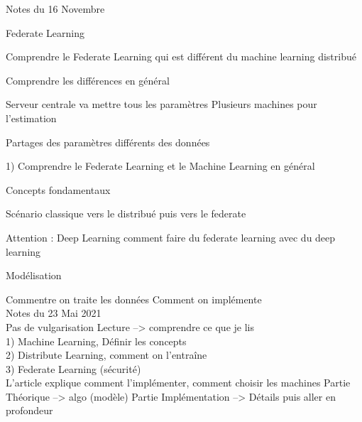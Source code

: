 \documentclass[12pt,a4paper]{article}
\begin{document}
Notes du 16 Novembre

Federate Learning

Comprendre le Federate Learning qui est différent du machine learning distribué 

Comprendre les différences en général

Serveur centrale va mettre tous les paramètres 
Plusieurs machines pour l'estimation

Partages des paramètres différents des données

1) Comprendre le Federate Learning et le Machine Learning en général

Concepts fondamentaux

Scénario classique vers le distribué puis vers le federate

Attention : Deep Learning comment faire du federate learning avec du deep learning

Modélisation

Commentre on traite les données
Comment on implémente\\




Notes du 23 Mai 2021\\
Pas de vulgarisation 
Lecture --> comprendre ce que je lis\\
1) Machine Learning, Définir les concepts\\
2) Distribute Learning, comment on l'entraîne\\
3) Federate Learning (sécurité)\\

L'article explique comment l'implémenter, comment choisir les machines
Partie Théorique --> algo (modèle)
Partie Implémentation --> Détails puis aller en profondeur
\end{document}
